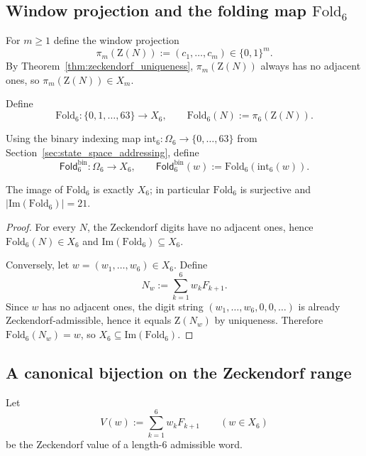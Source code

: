 \subsection{Window projection and the folding map \texorpdfstring{$\mathrm{Fold}_6$}{Fold\_6}}
For $m\ge 1$ define the window projection
\[
\pi_m(\mathrm{Z}(N)) := (c_1,\dots,c_m)\in\{0,1\}^m.
\]
By Theorem~\ref{thm:zeckendorf_uniqueness}, $\pi_m(\mathrm{Z}(N))$ always has no adjacent ones, so $\pi_m(\mathrm{Z}(N))\in X_m$.

\begin{definition}
Define
\[
\mathrm{Fold}_6:\{0,1,\dots,63\}\to X_6,
\qquad
\mathrm{Fold}_6(N):=\pi_6(\mathrm{Z}(N)).
\]
\end{definition}

\begin{definition}
Using the binary indexing map $\mathrm{int}_6:\Omega_6\to\{0,\dots,63\}$ from Section~\ref{sec:state_space_addressing}, define
\[
\mathsf{Fold}^{\mathrm{bin}}_6:\Omega_6\to X_6,
\qquad
\mathsf{Fold}^{\mathrm{bin}}_6(w):=\mathrm{Fold}_6(\mathrm{int}_6(w)).
\]
\end{definition}

\begin{proposition}
\label{prop:fold6_surjective}
The image of $\mathrm{Fold}_6$ is exactly $X_6$; in particular $\mathrm{Fold}_6$ is surjective and $|\mathrm{Im}(\mathrm{Fold}_6)|=21$.
\end{proposition}

\begin{proof}
For every $N$, the Zeckendorf digits have no adjacent ones, hence $\mathrm{Fold}_6(N)\in X_6$ and $\mathrm{Im}(\mathrm{Fold}_6)\subseteq X_6$.

Conversely, let $w=(w_1,\dots,w_6)\in X_6$.
Define
\[
N_w:=\sum_{k=1}^6 w_k F_{k+1}.
\]
Since $w$ has no adjacent ones, the digit string $(w_1,\dots,w_6,0,0,\dots)$ is already Zeckendorf-admissible, hence it equals $\mathrm{Z}(N_w)$ by uniqueness.
Therefore $\mathrm{Fold}_6(N_w)=w$, so $X_6\subseteq \mathrm{Im}(\mathrm{Fold}_6)$.
\end{proof}

\subsection{A canonical bijection on the Zeckendorf range}
\label{subsec:zeckendorf_range_bijection}
Let
\[
V(w):=\sum_{k=1}^6 w_k F_{k+1}
\qquad (w\in X_6)
\]
be the Zeckendorf value of a length-$6$ admissible word.

